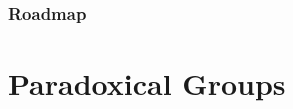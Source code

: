 \documentclass{beamer}
\theoremstyle{example}
\begin{document}


\begin{frame}
\frametitle{Roadmap}
\begin{center}
\begin{minipage}{\widthof{(4) Representation Theory:\ Categorified}}
\setlength{\parskip}{4ex}
\tableofcontents
\end{minipage}
\end{center}
\end{frame}


\section{Paradoxical Groups}
\end{document}
